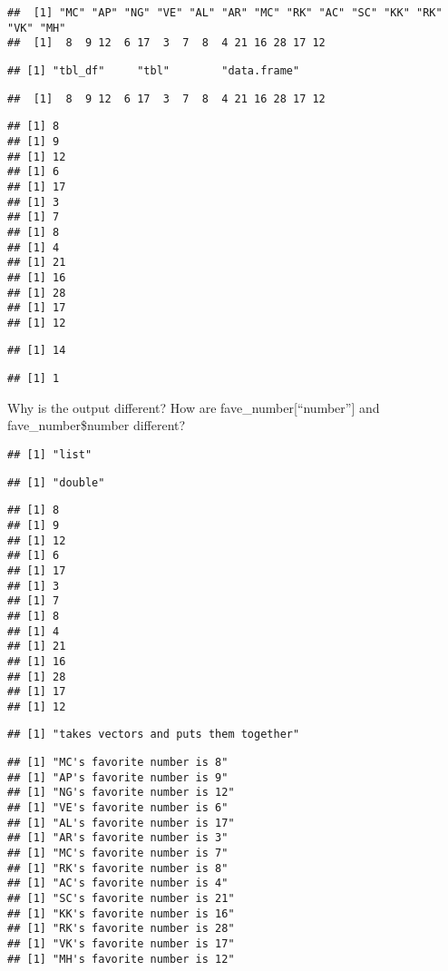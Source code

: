 \documentclass[
]{article}
\begin{document}
\begin{verbatim}
##  [1] "MC" "AP" "NG" "VE" "AL" "AR" "MC" "RK" "AC" "SC" "KK" "RK" "VK" "MH"
##  [1]  8  9 12  6 17  3  7  8  4 21 16 28 17 12
\end{verbatim}

\begin{verbatim}
## [1] "tbl_df"     "tbl"        "data.frame"
\end{verbatim}

\begin{verbatim}
##  [1]  8  9 12  6 17  3  7  8  4 21 16 28 17 12
\end{verbatim}

\begin{verbatim}
## [1] 8
## [1] 9
## [1] 12
## [1] 6
## [1] 17
## [1] 3
## [1] 7
## [1] 8
## [1] 4
## [1] 21
## [1] 16
## [1] 28
## [1] 17
## [1] 12
\end{verbatim}

\begin{verbatim}
## [1] 14
\end{verbatim}

\begin{verbatim}
## [1] 1
\end{verbatim}

Why is the output different? How are fave\_number{[}``number''{]} and
fave\_number\$number different?

\begin{verbatim}
## [1] "list"
\end{verbatim}

\begin{verbatim}
## [1] "double"
\end{verbatim}

\begin{verbatim}
## [1] 8
## [1] 9
## [1] 12
## [1] 6
## [1] 17
## [1] 3
## [1] 7
## [1] 8
## [1] 4
## [1] 21
## [1] 16
## [1] 28
## [1] 17
## [1] 12
\end{verbatim}

\begin{verbatim}
## [1] "takes vectors and puts them together"
\end{verbatim}

\begin{verbatim}
## [1] "MC's favorite number is 8"
## [1] "AP's favorite number is 9"
## [1] "NG's favorite number is 12"
## [1] "VE's favorite number is 6"
## [1] "AL's favorite number is 17"
## [1] "AR's favorite number is 3"
## [1] "MC's favorite number is 7"
## [1] "RK's favorite number is 8"
## [1] "AC's favorite number is 4"
## [1] "SC's favorite number is 21"
## [1] "KK's favorite number is 16"
## [1] "RK's favorite number is 28"
## [1] "VK's favorite number is 17"
## [1] "MH's favorite number is 12"
\end{verbatim}
\end{document}
